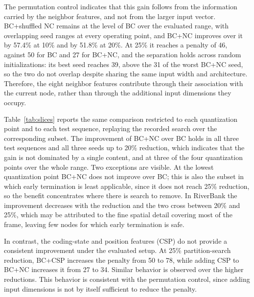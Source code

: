 \documentclass{article}
\begin{document}
The permutation control indicates that this gain follows from the information carried by the neighbor features, and not from the larger input vector. BC+shuffled NC remains at the level of BC over the evaluated range, with overlapping seed ranges at every operating point, and BC+NC improves over it by 57.4\% at 10\% and by 51.8\% at 20\%. At 25\% it reaches a penalty of 46, against 50 for BC and 27 for BC+NC, and the separation holds across random initializations: its best seed reaches 39, above the 31 of the worst BC+NC seed, so the two do not overlap despite sharing the same input width and architecture. Therefore, the eight neighbor features contribute through their association with the current node, rather than through the additional input dimensions they occupy.

Table~\ref{tab:slices} reports the same comparison restricted to each quantization point and to each test sequence, replaying the recorded search over the corresponding subset. The improvement of BC+NC over BC holds in all three test sequences and all three seeds up to 20\% reduction, which indicates that the gain is not dominated by a single content, and at three of the four quantization points over the whole range. Two exceptions are visible. At the lowest quantization point BC+NC does not improve over BC; this is also the subset in which early termination is least applicable, since it does not reach 25\% reduction, so the benefit concentrates where there is search to remove. In RiverBank the improvement decreases with the reduction and the two cross between 20\% and 25\%, which may be attributed to the fine spatial detail covering most of the frame, leaving few nodes for which early termination is safe.

In contrast, the coding-state and position features (CSP) do not provide
a consistent improvement under the evaluated setup. At 25\% partition-search reduction, BC+CSP increases the penalty from 50 to 78, while adding CSP to BC+NC increases it from 27 to 34. Similar behavior is observed over the higher reductions. This behavior is consistent with the permutation control, since adding input dimensions is not by itself sufficient to reduce the penalty.
\end{document}
